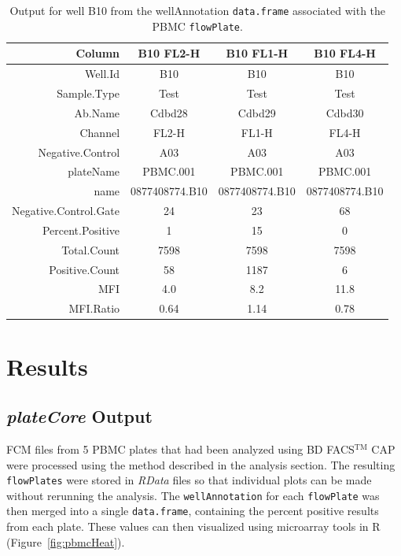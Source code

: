 \documentclass[12pt]{article}
\newcommand{\Robject}[1]{{\texttt{#1}}}
\newcommand{\Rpackage}[1]{{\textit{#1}}}
\begin{document}
\begin{table}[ht]
\begin{center}
\begin{tabular}{r|ccc}
  \hline
Column & B10 FL2-H &  B10 FL1-H & B10 FL4-H \\
    \hline
  Well.Id & B10 & B10 & B10 \\
  Sample.Type & Test & Test & Test \\
  Ab.Name & Cdbd28 & Cdbd29 & Cdbd30 \\
  Channel & FL2-H & FL1-H & FL4-H \\
  Negative.Control & A03 & A03 & A03 \\
  plateName & PBMC.001 & PBMC.001 & PBMC.001 \\
  name & 0877408774.B10 & 0877408774.B10 & 0877408774.B10 \\
  Negative.Control.Gate & 24 & 23 & 68 \\
  Percent.Positive &  1 & 15 &  0 \\
  Total.Count & 7598 & 7598 & 7598 \\
  Positive.Count &   58 & 1187 &    6 \\
  MFI &  4.0 &  8.2 & 11.8 \\
  MFI.Ratio & 0.64 & 1.14 & 0.78 \\
   \hline
\end{tabular}
\caption{Output for well B10 from the wellAnnotation \Robject{data.frame} associated with the PBMC \Robject{flowPlate}.}
\label{tab:wellAnno}
\end{center}
\end{table}

\clearpage
\section*{Results}
\subsection*{\Rpackage{plateCore} Output}

FCM files from 5 PBMC plates that had been analyzed using BD FACS$^{\text{TM}}$ CAP were processed using the method
described in the analysis section. The resulting \Robject{flowPlates} were stored in \emph{RData} files so that individual plots
can be made without rerunning the analysis. The \Robject{wellAnnotation} for each \Robject{flowPlate} was then merged
into a single \Robject{data.frame}, containing the percent positive results from each plate. These values can then visualized
using microarray tools in R (Figure~\ref{fig:pbmcHeat}). 
\end{document}

